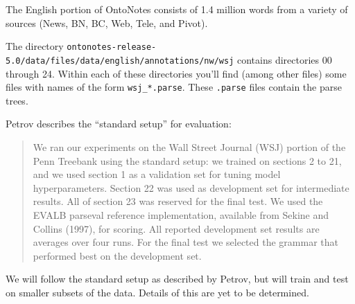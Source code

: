 \documentclass[english]{article}
\renewenvironment{comment}
    {%
     \par\medskip\noindent
     \tabularx{\textwidth}{|>{\columncolor[gray]{0.9}}X|}
     \hline
     \emph{\textbf{Comment:}}%
    }
    {%
     \endtabularx\hrule\par\medskip
    }
\begin{document}
The English portion of OntoNotes consists of 1.4 million words from a variety of sources (News, BN, BC, Web, Tele, and Pivot).

The directory \texttt{ontonotes-release-5.0/data/files/data/english/annotations/nw/wsj} contains directories 00 through 24. Within each of these directories you'll find (among other files) some files with names of the form \texttt{wsj\_*.parse}. These \texttt{.parse} files contain the parse trees. 

Petrov describes the ``standard setup'' for evaluation:
\begin{quote}
We ran our experiments on the Wall Street Journal (WSJ) portion of the Penn Treebank using the standard setup: we trained on sections 2 to 21, and we used section 1 as a validation set for tuning model hyperparameters. Section 22 was used as development set for intermediate results. All of section 23 was reserved for the final test. We used the EVALB parseval reference implementation, available from Sekine and Collins (1997), for scoring. All reported development set results are averages over four runs. For the final test we selected the grammar that performed best on the development set.
\end{quote}

We will follow the standard setup as described by Petrov, but will train and test on smaller subsets of the data. Details of this are yet to be determined.


\end{document}
